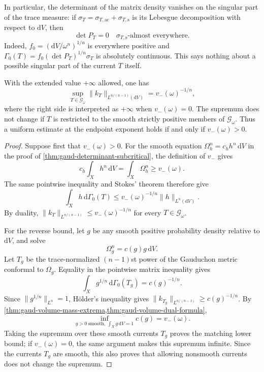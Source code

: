 In particular, the determinant of the matrix density vanishes on the singular part of the trace measure: if $\sigma_T=\sigma_{T,\mathrm{ac}}+\sigma_{T,\mathrm{s}}$ is its Lebesgue decomposition with respect to $\mathrm{d}V$, then
\[
 \det P_T=0\quad\sigma_{T,\mathrm{s}}\text{-almost everywhere}.
\]
Indeed, $f_0=(\mathrm{d}V/\omega^n)^{1/n}$ is everywhere positive and $\Gamma_0(T)=f_0(\det P_T)^{1/n}\sigma_T$ is absolutely continuous. This says nothing about a possible singular part of the current $T$ itself.

\begin{theorem}\label{thm:gaud-determinant-endpoint}
With the extended value $+\infty$ allowed, one has
\[
 \sup_{T\in\mathscr G_\omega}
       \|k_T\|_{L^{n/(n-1)}(\mathrm{d}V)}=v_-(\omega)^{-1/n},
\]
where the right side is interpreted as $+\infty$ when $v_-(\omega)=0$. The supremum does not change if $T$ is restricted to the smooth strictly positive members of $\mathscr G_\omega$. Thus a uniform estimate at the endpoint exponent holds if and only if $v_-(\omega)>0$.
\end{theorem}
\begin{proof}
Suppose first that $v_-(\omega)>0$. For the smooth equation $\Omega_h^n=c_hh^n\,\mathrm{d}V$ in the proof of \cref{thm:gaud-determinant-subcritical}, the definition of $v_-$ gives
\[
 c_h\int_Xh^n\,\mathrm{d}V=\int_X\Omega_h^n\geq v_-(\omega).
\]
The same pointwise inequality and Stokes' theorem therefore give
\[
 \int_Xh\,\mathrm{d}\Gamma_0(T)
      \leq v_-(\omega)^{-1/n}\|h\|_{L^n(\mathrm{d}V)}.
\]
By duality, $\|k_T\|_{L^{n/(n-1)}}\leq v_-(\omega)^{-1/n}$ for every $T\in\mathscr G_\omega$.

For the reverse bound, let $g$ be any smooth positive probability density relative to $\mathrm{d}V$, and solve
\[
 \Omega_g^n=c(g)g\,\mathrm{d}V.
\]
Let $T_g$ be the trace-normalized $(n-1)$st power of the Gauduchon metric conformal to $\Omega_g$. Equality in the pointwise matrix inequality gives
\[
 \int_Xg^{1/n}\,\mathrm{d}\Gamma_0(T_g)=c(g)^{-1/n}.
\]
Since $\|g^{1/n}\|_{L^n}=1$, H\"older's inequality gives $\|k_{T_g}\|_{L^{n/(n-1)}}\geq c(g)^{-1/n}$. By \cref{thm:gaud-volume-mass-extrema,thm:gaud-volume-dual-formula},
\[
 \inf_{g>0\ \mathrm{smooth},\ \int_Xg\,\mathrm{d}V=1}c(g)=v_-(\omega).
\]
Taking the supremum over these smooth currents $T_g$ proves the matching lower bound; if $v_-(\omega)=0$, the same argument makes this supremum infinite. Since the currents $T_g$ are smooth, this also proves that allowing nonsmooth currents does not change the supremum.
\end{proof}

